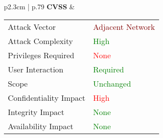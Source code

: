 \begin{longtable}{ p{2.3cm} | p{.79\linewidth} }
    \textbf{CVSS} &
        \begin{tabular}[t]{@{}l | l}
            Attack Vector           & \textcolor{Maroon}{Adjacent Network} \\
            Attack Complexity       & \textcolor{Green}{High} \\
            Privileges Required     & \textcolor{red}{None} \\
            User Interaction        & \textcolor{Green}{Required} \\
            Scope                   & \textcolor{Green}{Unchanged} \\
            Confidentiality Impact  & \textcolor{red}{High} \\
            Integrity Impact        & \textcolor{Green}{None} \\
            Availability Impact     & \textcolor{Green}{None}
        \end{tabular} \\
    \hline
\end{longtable}

